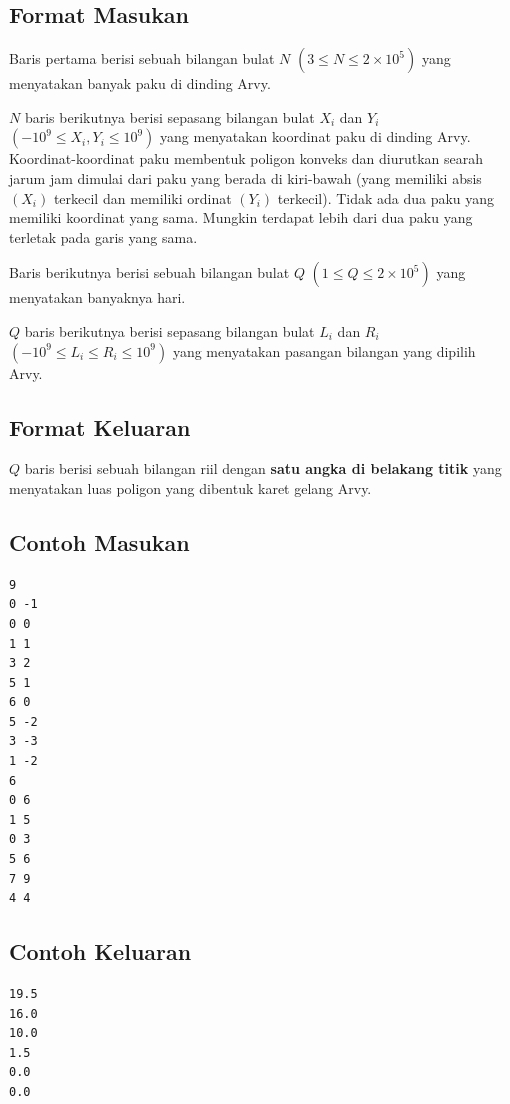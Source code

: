\documentclass{article}
\begin{document}
\subsection*{Format Masukan}
Baris pertama berisi sebuah bilangan bulat $N$ $(3 \leq N \leq 2 \times 10^{5})$ yang menyatakan banyak paku di dinding Arvy.

$N$ baris berikutnya berisi sepasang bilangan bulat $X_i$ dan $Y_i$ $(-10^{9} \leq X_i,Y_i \leq 10^{9})$ yang menyatakan koordinat paku di dinding Arvy. Koordinat-koordinat paku membentuk poligon konveks dan diurutkan searah jarum jam dimulai dari paku yang berada di kiri-bawah (yang memiliki absis $(X_i)$ terkecil dan memiliki ordinat $(Y_i)$ terkecil). Tidak ada dua paku yang memiliki koordinat yang sama. Mungkin terdapat lebih dari dua paku yang terletak pada garis yang sama.

Baris berikutnya berisi sebuah bilangan bulat $Q$ $(1 \leq Q \leq 2 \times 10^{5})$ yang menyatakan banyaknya hari.

$Q$ baris berikutnya berisi sepasang bilangan bulat $L_i$ dan $R_i$ $(-10^{9} \leq L_i \leq R_i \leq 10^{9})$ yang menyatakan pasangan bilangan yang dipilih Arvy.

\subsection*{Format Keluaran}
$Q$ baris berisi sebuah bilangan riil dengan \textbf{satu angka di belakang titik} yang menyatakan luas poligon yang dibentuk karet gelang Arvy.

\pagebreak

\begin{multicols}{2}
\subsection*{Contoh Masukan}
\begin{lstlisting}
9
0 -1
0 0
1 1
3 2
5 1
6 0
5 -2
3 -3
1 -2
6
0 6
1 5
0 3
5 6
7 9
4 4

\end{lstlisting}
\columnbreak
\subsection*{Contoh Keluaran}
\begin{lstlisting}
19.5
16.0
10.0
1.5
0.0
0.0
\end{lstlisting}
\vfill
\null
\end{multicols}
\end{document}
